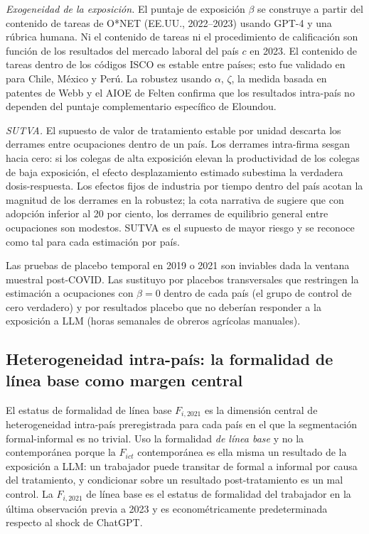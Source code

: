 \emph{Exogeneidad de la exposición.} El puntaje de exposición $\beta$ se construye a partir del contenido de tareas de O*NET (EE.UU., 2022--2023) usando GPT-4 y una rúbrica humana. Ni el contenido de tareas ni el procedimiento de calificación son función de los resultados del mercado laboral del país $c$ en 2023. El contenido de tareas dentro de los códigos ISCO es estable entre países; esto fue validado en \citet{Azuara2024_idb_ai} para Chile, México y Perú. La robustez usando $\alpha$, $\zeta$, la medida basada en patentes de Webb y el AIOE de Felten confirma que los resultados intra-país no dependen del puntaje complementario específico de Eloundou.

\emph{SUTVA.} El supuesto de valor de tratamiento estable por unidad descarta los derrames entre ocupaciones dentro de un país. Los derrames intra-firma sesgan hacia cero: si los colegas de alta exposición elevan la productividad de los colegas de baja exposición, el efecto desplazamiento estimado subestima la verdadera dosis-respuesta. Los efectos fijos de industria por tiempo dentro del país acotan la magnitud de los derrames en la robustez; la cota narrativa de \citet{BergBZ2018_ai_inequality} sugiere que con adopción inferior al 20 por ciento, los derrames de equilibrio general entre ocupaciones son modestos. SUTVA es el supuesto de mayor riesgo y se reconoce como tal para cada estimación por país.

Las pruebas de placebo temporal en 2019 o 2021 son inviables dada la ventana muestral post-COVID. Las sustituyo por placebos transversales que restringen la estimación a ocupaciones con $\beta = 0$ dentro de cada país (el grupo de control de cero verdadero) y por resultados placebo que no deberían responder a la exposición a LLM (horas semanales de obreros agrícolas manuales).

\subsection{Heterogeneidad intra-país: la formalidad de línea base como margen central}
\label{subsec:method_heterogeneity}

El estatus de formalidad de línea base $F_{i,2021}$ es la dimensión central de heterogeneidad intra-país preregistrada para cada país en el que la segmentación formal-informal es no trivial. Uso la formalidad \emph{de línea base} y no la contemporánea porque la $F_{ict}$ contemporánea es ella misma un resultado de la exposición a LLM: un trabajador puede transitar de formal a informal por causa del tratamiento, y condicionar sobre un resultado post-tratamiento es un mal control. La $F_{i,2021}$ de línea base es el estatus de formalidad del trabajador en la última observación previa a 2023 y es econométricamente predeterminada respecto al shock de ChatGPT.

